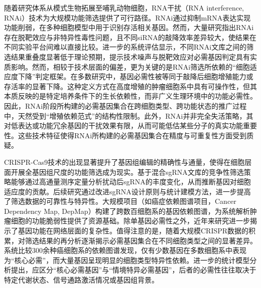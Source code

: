 随着研究体系从模式生物拓展至哺乳动物细胞，RNA干扰（RNA interference, RNAi）技术为大规模功能筛选提供了可行路径\cite{mohr2014rnai}。RNAi通过抑制mRNA表达实现功能削弱，在多种细胞模型中用于识别存活相关基因。然而，大量研究指出RNAi存在脱靶效应与非特异性毒性问题\cite{jackson2010recognizing}，且不同siRNA的敲降效率差异较大，使结果在不同实验平台间难以直接比较。进一步的系统评估显示，不同RNAi文库之间的筛选结果重叠度显著低于理论预期，提示技术噪声与脱靶效应对必需基因判定具有实质影响\cite{echeverri2006minimizing,birmingham2006utr}。然而，相较于技术层面的偏差，更为关键的是RNAi筛选所依赖的“细胞适应度下降”判定框架。在多数研究中，基因必需性被等同于敲降后细胞增殖能力或存活率的显著下降\cite{hart2015high}。这种定义方式在高度增殖的肿瘤细胞系中具有可操作性，但其本质反映的是特定培养条件下的生长依赖性，而非广义生理环境中的功能必需性。因此，RNAi阶段所构建的必需基因集合在跨细胞类型、跨功能状态的推广过程中，天然受到“增殖依赖范式”的结构性限制。此外，RNAi并非完全失活策略，其对低表达或功能冗余基因的干扰效果有限，从而可能低估某些分子的真实功能重要性。这些技术特征使得RNAi所构建的必需基因集合在精度与可重复性方面受到质疑。

CRISPR-Cas9技术的出现显著提升了基因组编辑的精确性与通量，使得在细胞层面开展全基因组尺度的功能筛选成为现实。基于混合sgRNA文库的竞争性筛选策略能够通过高通量测序定量分析扰动后sgRNA的丰度变化，从而推断基因对细胞适应度的贡献。后续研究通过改进sgRNA设计原则\cite{doench2016optimized}与统计建模方法，进一步提高了筛选数据的可靠性与特异性。大规模项目（如癌症依赖图谱项目，Cancer Dependency Map, DepMap）构建了跨数百细胞系的基因依赖图谱，为系统解析肿瘤细胞的功能脆弱性提供了资源基础。除单基因必需性之外，近年来研究进一步揭示了基因功能在网络层面的复杂性。值得注意的是，随着大规模CRISPR数据的积累，对筛选结果的再分析逐渐揭示必需基因集合在不同细胞类型之间的显著差异。系统比较300余种癌细胞系的依赖图谱发现，仅有少数基因在多数细胞系中表现为“核心必需”，而大量基因呈现明显的细胞类型特异性依赖\cite{behan2019prioritization}。进一步的统计模型分析提出，应区分“核心必需基因”与“情境特异必需基因”，后者的必需性往往取决于特定代谢状态、信号通路激活情况或基因组背景\cite{hart2016bagel}。

